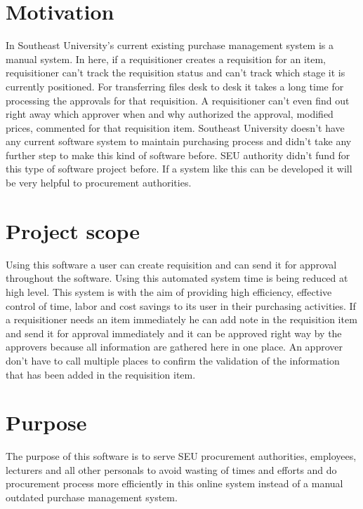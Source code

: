 \documentclass[12pt]{report} %
\begin{document}
\section{Motivation}
In Southeast University's current existing purchase management system is a manual system. In here, if a requisitioner creates a requisition for an item, requisitioner can't track the requisition status and can't track which stage it is currently positioned. For transferring files desk to desk it takes a long time for processing the approvals for that requisition. A requisitioner can't even find out right away which approver when and why authorized the approval, modified prices, commented for that requisition item. Southeast University doesn't have any current software system to maintain purchasing process and didn't take any further step to make this kind of software before. SEU authority didn't fund for this type of software project before. If a system like this can be developed it will be very helpful to procurement authorities.



\section{Project scope}
Using this software a user can create requisition and can send it for approval throughout the software. Using this automated system time is being reduced at high level. This system is with the aim of providing high efficiency, effective control of time, labor and cost savings to its user in their purchasing activities. If a requisitioner needs an item immediately he can add note in the requisition item and send it for approval immediately and it can be approved right way by the approvers because all information are gathered here in one place. An approver don't have to call multiple places to confirm the validation of the information that has been added in the requisition item.





\section{Purpose}
The purpose of this software is to serve SEU procurement authorities, employees, lecturers and all other personals to avoid wasting of times and efforts and do procurement process more efficiently in this online system instead of a manual outdated purchase management system.
\end{document}
